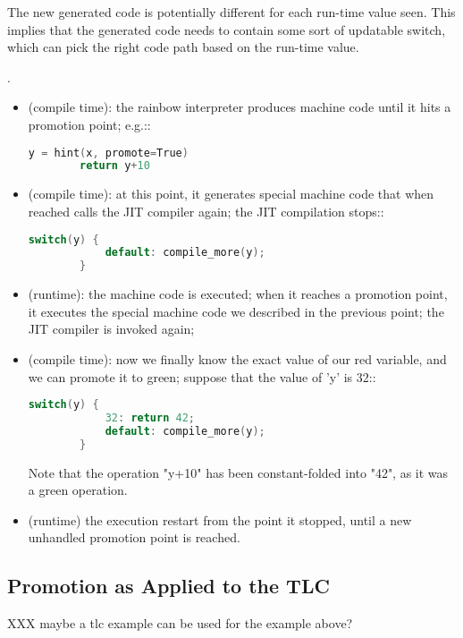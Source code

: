 The new generated code is potentially different for each run-time value
seen.  This implies that the generated code needs to contain some sort
of updatable switch, which can pick the right code path based on the
run-time value.

.

\begin{itemize}
  \item (compile time): the rainbow interpreter produces machine code until it
    hits a promotion point; e.g.::

    \begin{lstlisting}[language=C]
        y = hint(x, promote=True)
        return y+10
    \end{lstlisting}

  \item (compile time): at this point, it generates special machine code that when
    reached calls the JIT compiler again; the JIT compilation stops::

    \begin{lstlisting}[language=C]
        switch(y) {
            default: compile_more(y);
        }
    \end{lstlisting}

  \item (runtime): the machine code is executed; when it reaches a promotion
    point, it executes the special machine code we described in the previous
    point; the JIT compiler is invoked again;

  \item (compile time): now we finally know the exact value of our red variable,
    and we can promote it to green; suppose that the value of 'y' is 32::

    \begin{lstlisting}[language=C]
        switch(y) {
            32: return 42;
            default: compile_more(y);
        }
    \end{lstlisting}

    Note that the operation "y+10" has been constant-folded into "42", as it
    was a green operation.

  \item (runtime) the execution restart from the point it stopped, until a new
    unhandled promotion point is reached.
\end{itemize}

\subsection{Promotion as Applied to the TLC}

XXX maybe a tlc example can be used for the example above?


